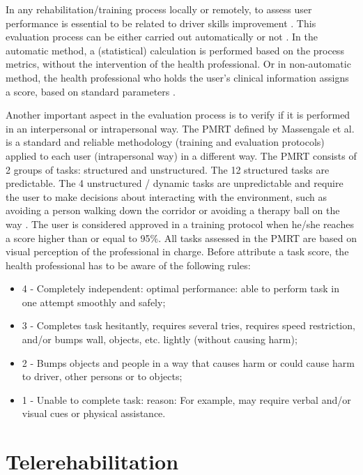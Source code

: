 In any rehabilitation/training process locally or remotely, to assess user performance is essential to be related to driver skills improvement \cite{macgillivray2018}. This evaluation process can be either carried out automatically or not \cite{john2018, massengale2005}. In the automatic method, a (statistical) calculation is performed based on the process metrics, without the intervention of the health professional\cite{john2018}. Or in non-automatic method, the health professional who holds the user's clinical information assigns a score, based on standard parameters \cite{massengale2005}.

Another important aspect in the evaluation process is to verify if it is performed in an interpersonal or intrapersonal way. The PMRT defined by Massengale et al. \cite{massengale2005} is a standard and reliable methodology (training and evaluation protocols) applied to each user (intrapersonal way) in a different way. The PMRT consists of 2 groups of tasks: structured and unstructured. The 12 structured tasks are predictable. The 4 unstructured / dynamic tasks are unpredictable and require the user to make decisions about interacting with the environment, such as avoiding a person walking down the corridor or avoiding a therapy ball on the way \cite{massengale2005}. The user is considered approved in a training protocol when he/she reaches a score higher than or equal to 95\%. All tasks assessed in the PMRT are based on visual perception of the professional in charge. Before attribute a task score, the health professional has to be aware of the following rules:
\begin{itemize}
\item 4 -  Completely independent: optimal performance: able to perform task in one attempt smoothly and safely;
\item 3 - Completes task hesitantly, requires several tries, requires speed restriction, and/or bumps wall, objects, etc. lightly (without causing harm);
\item 2 - Bumps objects and people in a way that causes harm or could cause harm to driver, other persons or to objects;
\item 1 - Unable to complete task: reason:  For example, may require verbal and/or visual cues or physical assistance.
\end{itemize} 

\section{Telerehabilitation}
\label{sec:telerehabilitation}

